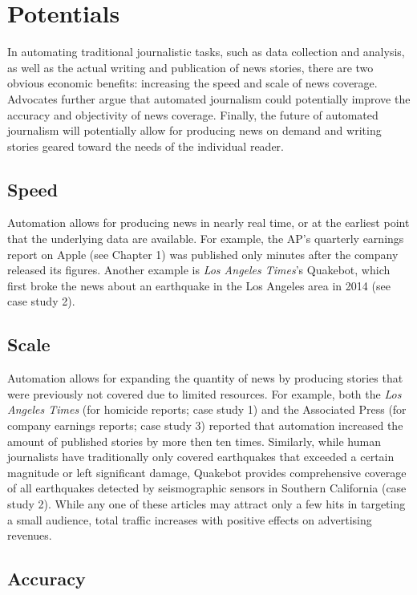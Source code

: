 \documentclass[notoc, symmetric, nobib, nols]{towcenter-guideto-book}
\begin{document}
\section{Potentials} 

In automating traditional journalistic tasks, such as data collection and analysis, as well as the actual writing and publication of news stories, there are two obvious economic benefits: increasing the speed and scale of news coverage. Advocates further argue that automated journalism could potentially improve the accuracy and objectivity of news coverage. Finally, the future of automated journalism will potentially allow for producing news on demand and writing stories geared toward the needs of the individual reader.
 
\subsection{Speed}

Automation allows for producing news in nearly real time, or at the earliest point that the underlying data are available. For example, the AP's quarterly earnings report on Apple (see Chapter 1) was published only minutes after the company released its figures. Another example is \textit{Los Angeles Times}'s Quakebot, which first broke the news about an earthquake in the Los Angeles area in 2014 (see case study 2). 

\subsection{Scale}

Automation allows for expanding the quantity of news by producing stories that were previously not covered due to limited resources. For example, both the \textit{Los Angeles Times} (for homicide reports; case study 1) and the Associated Press (for company earnings reports; case study 3) reported that automation increased the amount of published stories by more then ten times. Similarly, while human journalists have traditionally only covered earthquakes that exceeded a certain magnitude or left significant damage, Quakebot provides comprehensive coverage of all earthquakes detected by seismographic sensors in Southern California (case study 2). While any one of these articles may attract only a few hits in targeting a small audience, total traffic increases with positive effects on advertising revenues.

\subsection{Accuracy}
\end{document}
